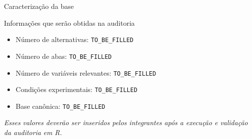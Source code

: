 \begin{frame}{Caracterização da base}

    \begin{block}{Informações que serão obtidas na auditoria}

        \begin{itemize}
            \item Número de alternativas:
                  \texttt{TO\_BE\_FILLED}

            \item Número de abas:
                  \texttt{TO\_BE\_FILLED}

            \item Número de variáveis relevantes:
                  \texttt{TO\_BE\_FILLED}

            \item Condições experimentais:
                  \texttt{TO\_BE\_FILLED}

            \item Base canônica:
                  \texttt{TO\_BE\_FILLED}
        \end{itemize}

    \end{block}

    \vspace{0.3cm}

    \centering
    \textit{Esses valores deverão ser inseridos pelos integrantes após
    a execução e validação da auditoria em R.}

\end{frame}


%
%
%
%
%


%
%
%
%
%


%
%
%
